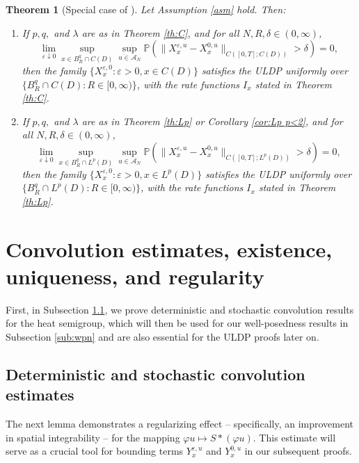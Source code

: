 \documentclass[10pt,a4paper]{amsart}
\newtheorem{theorem}{Theorem}[section]
\numberwithin{equation}{section}
\newcommand{\Cper}{C(D)}
\renewcommand{\P}{{\mathbb P}}
\newcommand{\eps}{\varepsilon}
\newcommand{\A}{{\mathcal A}}
\begin{document}
\begin{theorem}[{Special case of \cite[Th.\ 2.13]{Salins19equivalences}}]
\label{th:uldp suff}
Let Assumption \ref{asm} hold. Then:
\begin{enumerate}
  \item If $p,q,$ and $\lambda$ are as in Theorem \ref{th:C},   and for all $N,R,\delta\in( 0,\infty)$, 
\[
\lim_{\eps\downarrow 0}\sup_{x\in B_{R}^q \cap C(D)}\sup_{u\in\A_N}\P(\|X_x^{\eps,u}-X_x^{0,u}\|_{C([0,T];\Cper)}>\delta)=0, 
\]
then the family $\{X_x^{\eps,0}:\eps>0,x\in C(D)\}$ satisfies the ULDP uniformly over $\{B_{R}^q\cap C(D):R\in[0,\infty)\}$,  with the rate functions $I_x$  stated in Theorem \ref{th:C}. 
\item  If $p,q,$ and $\lambda$ are as in Theorem \ref{th:Lp} or Corollary  \ref{cor:Lp p<2}, and for all $N,R,\delta\in( 0,\infty)$,  
    \[
\lim_{\eps\downarrow 0}\sup_{x\in B_R^{q}\cap L^p(D)}\sup_{u\in\A_N}\P(\|X_x^{\eps,u}-X_x^{0,u}\|_{C([0,T];L^p(D))}>\delta)=0,  
\] 
then the family $\{X_x^{\eps,0}:\eps>0,x\in L^p(D)\}$ satisfies the ULDP uniformly over $\{B_{R}^{q}\cap L^p(D):R\in[0,\infty) \}$, with the rate functions $I_x$  stated in Theorem \ref{th:Lp}. 
\end{enumerate}
\end{theorem}

\section{Convolution estimates, existence, uniqueness, and regularity}\label{sec:wpn estimates}

First, in Subsection \ref{sub:convolution estimates}, we prove  deterministic and stochastic convolution results for the heat semigroup, which will then be used for our well-posedness results in Subsection \ref{sub:wpn} and are also essential for the ULDP proofs later on. 

\subsection{Deterministic and stochastic convolution estimates}\label{sub:convolution estimates}


 
The next lemma demonstrates a regularizing effect -- specifically, an improvement in spatial integrability -- for the mapping $\varphi u\mapsto S*(\varphi u)$. This estimate will serve as a crucial tool for bounding terms $Y_x^{\eps,u}$ and $Y_x^{0,u}$ in our subsequent proofs. 
 
\end{document}
